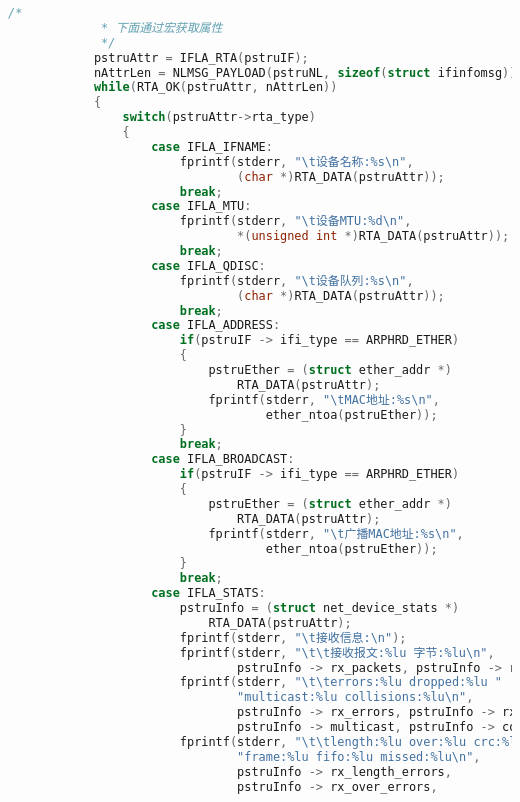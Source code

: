 \documentclass[a4paper,11pt,]{article}%
\begin{document}
\begin{appendices}
\begin{lstlisting}[language=C, caption= NetLink 获取网卡信息]
            /*
             * 下面通过宏获取属性
             */
            pstruAttr = IFLA_RTA(pstruIF);
            nAttrLen = NLMSG_PAYLOAD(pstruNL, sizeof(struct ifinfomsg));
            while(RTA_OK(pstruAttr, nAttrLen))
            {
                switch(pstruAttr->rta_type)
                {
                    case IFLA_IFNAME:
                        fprintf(stderr, "\t设备名称:%s\n",
                                (char *)RTA_DATA(pstruAttr));
                        break;
                    case IFLA_MTU:
                        fprintf(stderr, "\t设备MTU:%d\n",
                                *(unsigned int *)RTA_DATA(pstruAttr));
                        break;
                    case IFLA_QDISC:
                        fprintf(stderr, "\t设备队列:%s\n",
                                (char *)RTA_DATA(pstruAttr));
                        break;
                    case IFLA_ADDRESS:
                        if(pstruIF -> ifi_type == ARPHRD_ETHER)
                        {
                            pstruEther = (struct ether_addr *)
                                RTA_DATA(pstruAttr);
                            fprintf(stderr, "\tMAC地址:%s\n",
                                    ether_ntoa(pstruEther));
                        }
                        break;
                    case IFLA_BROADCAST:
                        if(pstruIF -> ifi_type == ARPHRD_ETHER)
                        {
                            pstruEther = (struct ether_addr *)
                                RTA_DATA(pstruAttr);
                            fprintf(stderr, "\t广播MAC地址:%s\n",
                                    ether_ntoa(pstruEther));
                        }
                        break;
                    case IFLA_STATS:
                        pstruInfo = (struct net_device_stats *)
                            RTA_DATA(pstruAttr);
                        fprintf(stderr, "\t接收信息:\n");
                        fprintf(stderr, "\t\t接收报文:%lu 字节:%lu\n",
                                pstruInfo -> rx_packets, pstruInfo -> rx_bytes);
                        fprintf(stderr, "\t\terrors:%lu dropped:%lu "
                                "multicast:%lu collisions:%lu\n",
                                pstruInfo -> rx_errors, pstruInfo -> rx_dropped,
                                pstruInfo -> multicast, pstruInfo -> collisions);
                        fprintf(stderr, "\t\tlength:%lu over:%lu crc:%lu "
                                "frame:%lu fifo:%lu missed:%lu\n",
                                pstruInfo -> rx_length_errors,
                                pstruInfo -> rx_over_errors,

\end{lstlisting}
\end{appendices}
\end{document}
